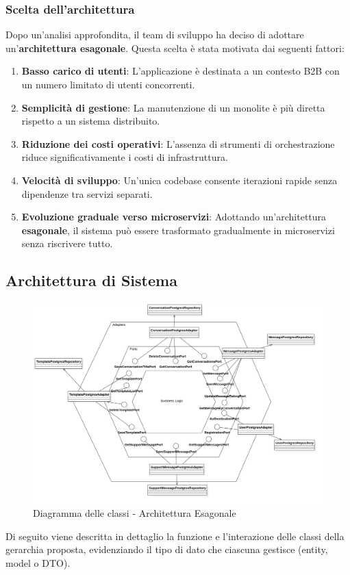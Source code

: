 \subsubsection{Scelta dell'architettura}
Dopo un’analisi approfondita, il team di sviluppo ha deciso di adottare un’\textbf{architettura esagonale}. Questa scelta è stata motivata dai seguenti fattori:
\begin{enumerate}
    \item \textbf{Basso carico di utenti}: L’applicazione è destinata a un contesto B2B con un numero limitato di utenti concorrenti.
    \item \textbf{Semplicità di gestione}: La manutenzione di un monolite è più diretta rispetto a un sistema distribuito.
    \item \textbf{Riduzione dei costi operativi}: L’assenza di strumenti di orchestrazione riduce significativamente i costi di infrastruttura.
    \item \textbf{Velocità di sviluppo}: Un’unica codebase consente iterazioni rapide senza dipendenze tra servizi separati.
    \item \textbf{Evoluzione graduale verso microservizi}: Adottando un’architettura \textbf{esagonale}, il sistema può essere trasformato gradualmente in microservizi senza riscrivere tutto.
\end{enumerate}


\subsection{Architettura di Sistema}
\begin{figure}[H]
    \centering
    \includegraphics[width=\linewidth, height=0.8\textheight, keepaspectratio]{./img/png/Model8!ArchitetturaEsagonale_8.png}
    \caption{Diagramma delle classi - Architettura Esagonale}
    \label{fig:architettura_esagonale}
\end{figure}
Di seguito viene descritta in dettaglio la funzione e l'interazione delle classi della gerarchia proposta, evidenziando il tipo di dato che ciascuna gestisce (entity, model o DTO).

